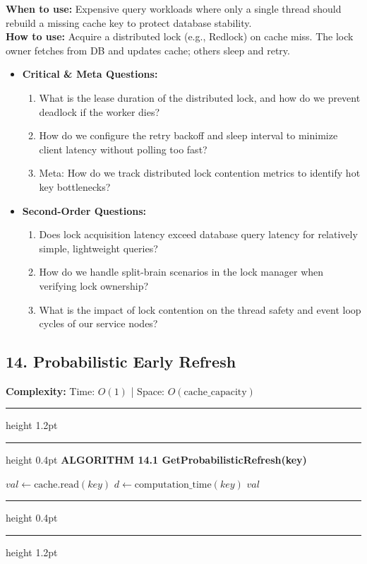 \documentclass[11pt,a4paper]{article}
\newenvironment{textbookalgo}[2]{%
  \par\addvspace{1.2em}\noindent
  \hrule height 1.2pt
  \vspace{1.5pt}
  \hrule height 0.4pt
  \vspace{5pt}
  {\noindent\large\bfseries\sffamily ALGORITHM #1 \quad #2}
  \par\vspace{5pt}
  \RestyleAlgo{plain}
}{%
  \par\vspace{4pt}
  \hrule height 0.4pt
  \vspace{1.5pt}
  \hrule height 1.2pt
  \par\addvspace{1.2em}
}
\theoremstyle{definition}
\begin{document}
\noindent
\textbf{When to use:} Expensive query workloads where only a single thread should rebuild a missing cache key to protect database stability.\\
\textbf{How to use:} Acquire a distributed lock (e.g., Redlock) on cache miss. The lock owner fetches from DB and updates cache; others sleep and retry.
\begin{itemize}[leftmargin=*]
  \item[] \textbf{Critical \& Meta Questions:}
  \begin{enumerate}
  \item What is the lease duration of the distributed lock, and how do we prevent deadlock if the worker dies?
  \item How do we configure the retry backoff and sleep interval to minimize client latency without polling too fast?
  \item Meta: How do we track distributed lock contention metrics to identify hot key bottlenecks?
  \end{enumerate}
  \item[] \textbf{Second-Order Questions:}
  \begin{enumerate}
  \item Does lock acquisition latency exceed database query latency for relatively simple, lightweight queries?
  \item How do we handle split-brain scenarios in the lock manager when verifying lock ownership?
  \item What is the impact of lock contention on the thread safety and event loop cycles of our service nodes?
  \end{enumerate}
\end{itemize}
\medskip

\clearpage
\subsection{14. Probabilistic Early Refresh}

\noindent
\textbf{Complexity:} Time: $O(1)$ | Space: $O(\text{cache\_capacity})$
\smallskip

\begin{textbookalgo}{14.1}{GetProbabilisticRefresh(key)}
\begin{algorithm}[H]
$val \leftarrow \text{cache.read}(key)$\;
$d \leftarrow \text{computation\_time}(key)$\;
\Return $val$\;
\end{algorithm}
\end{textbookalgo}
\end{document}
